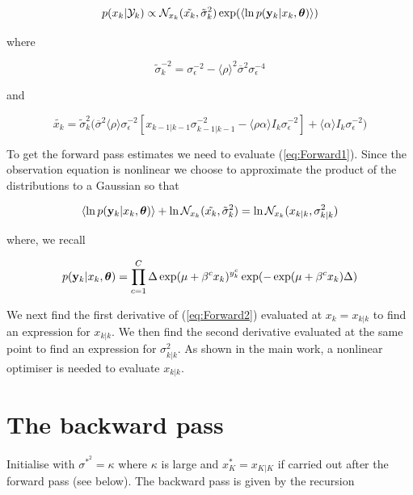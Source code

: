 \documentclass{article}
\begin{document}
\begin{equation}\label{eq:Forward1}
p(x_k | \Yk) \propto \N_{x_k}(\tilde{x_k}, \tilde{\sigma}^2_k) \exp(\langle \ln p(\yk | x_k,\thetab)\rangle )
\end{equation}

\noindent where

\begin{equation*}
\tilde{\sigma}^{-2}_k = \sigma^{-2}_{\epsilon} - \langle \rho \rangle^2 \overline{\sigma}^{2}\sigma^{-4}_{\epsilon}
\end{equation*}


and

\begin{equation*}
\tilde{x_k} = \tilde{\sigma}^{2}_k\bigg(\overline{\sigma}^{2}\langle \rho \rangle \sigma^{-2}_{\epsilon}[x_{k-1|k-1}\sigma^{-2}_{k-1|k-1} - \langle \rho \alpha \rangle I_k \sigma^{-2}_{\epsilon}] + \langle \alpha \rangle I_k \sigma^{-2}_{\epsilon}\bigg)
\end{equation*}

To get the forward pass estimates we need to evaluate (\ref{eq:Forward1}). Since the observation equation is nonlinear we choose to approximate the product of the distributions to a Gaussian so that

\begin{equation}\label{eq:Forward2}
\langle \ln p(\yk | x_k, \thetab)\rangle + \ln \N_{x_k}(\tilde{x_k} , \tilde{\sigma}^2_k) = \ln \N_{x_k}(x_{k|k} , \sigma^2_{k|k})
\end{equation}

\noindent where, we recall

\begin{equation*}
 p({\bf y}_k | x_k, {\bm \theta}) = \prod_{c=1}^C\Delta\exp(\mu + \beta^cx_k)^{y_k^c}\exp(-\exp(\mu + \beta^cx_k)\Delta)
\end{equation*}

We next find the first derivative of (\ref{eq:Forward2}) evaluated at $x_k = x_{k|k}$ to find an expression for $x_{k|k}$. We then find the second derivative evaluated at the same point to find an expression for $\sigma^2_{k|k}$. As shown in the main work, a nonlinear optimiser is needed to evaluate $x_{k|k}$.

\section{The backward pass}

Initialise with $\sigma^{*^2} = \kappa$ where $\kappa$ is large and $x^*_{K} = x_{K|K}$ if carried out after the forward pass (see below). The backward pass is given by the recursion \cite{Beal_2003b}
\end{document}
